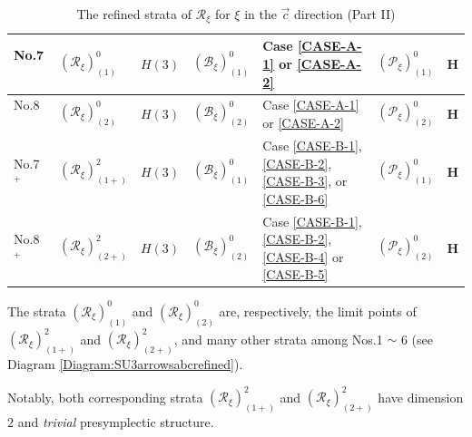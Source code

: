 \documentclass[12pt]{amsart}
\theoremstyle{definition}
\numberwithin{equation}{section}
\newcommand{\Reducedxi}{\mathcal{R}_\xi}
\newcommand{\Pxi}{\mathcal{P}_{\xi}}
\newcommand{\Bxi}{\mathcal{B}_{\xi}}
\newcommand{\Cartan}{\mathbf{H}}
\begin{document}
{   \begin{table}[H]\centering
 \caption{The refined strata of  $\Reducedxi  $  for  $\xi$ in the $\vec{c}$ direction (Part II)} \label{Table:strataveccxi2} 
       \begin{supertabular}{|p{0.9cm}|p{2.2cm}| p{1.2cm}|p{2.3cm}|p{2.4cm}|  p{2.6cm} | p{1.5cm}      |  }\hline
         No.7 ~&
   $(\Reducedxi)^0_{(1)}$ & $H(3)$	& $(\Bxi)^0_{(1)}  $ & Case \eqref{CASE-A-1} or \eqref{CASE-A-2}   &  $(\Pxi)^0_{(1)}$ &  $\Cartan$   \\
   \hline  No.8 ~&
   $(\Reducedxi)^0_{(2)}$ & $H(3)$	& $(\Bxi)^0_{(2)}  $ & Case \eqref{CASE-A-1} or \eqref{CASE-A-2}   &  $(\Pxi)^0_{(2)}$ &  $\Cartan$   \\ 
\hline  
       No.7$^+$ ~&
  $(\Reducedxi)^2_{(1+)}$ & $H(3)$	& $(\Bxi)^0_{(1)}  $ & Case   \eqref{CASE-B-1}, \eqref{CASE-B-2},    \eqref{CASE-B-3}, or \eqref{CASE-B-6}   &  $(\Pxi)^0_{(1)}$ &  $\Cartan$   \\
 \hline   No.8$^+$ ~&
  $(\Reducedxi)^2_{(2+)}$ & $H(3)$	& $(\Bxi)^0_{(2)}  $ & Case   \eqref{CASE-B-1}, \eqref{CASE-B-2}, \eqref{CASE-B-4} or \eqref{CASE-B-5}    &  $(\Pxi)^0_{(2)}$ &  $\Cartan$   \\ 
   \hline  
   \end{supertabular}
   \end{table}
   The  strata $(\Reducedxi)^0_{(1)}$ and $(\Reducedxi)^0_{(2)}$ are, respectively, the limit points of $(\Reducedxi)^2_{(1+)}$ and $(\Reducedxi)^2_{(2+)}$, and  many other strata among Nos.1 $\sim$ 6 (see Diagram \ref{Diagram:SU3arrowsabcrefined}). 
   
   Notably, both corresponding strata $(\Reducedxi)^2_{(1+)}$ and $(\Reducedxi)^2_{(2+)}$ have dimension \(2\)  and \emph{trivial} presymplectic structure.
   
}
\end{document}
